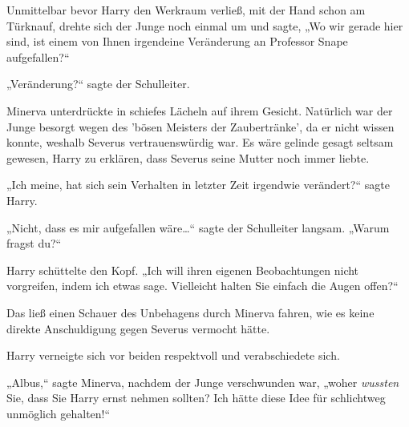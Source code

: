 Unmittelbar bevor Harry den Werkraum verließ, mit der Hand schon am Türknauf, drehte sich der Junge noch einmal um und sagte, „Wo wir gerade hier sind, ist einem von Ihnen irgendeine Veränderung an Professor Snape aufgefallen?“

„Veränderung?“ sagte der Schulleiter.

Minerva unterdrückte in schiefes Lächeln auf ihrem Gesicht. Natürlich war der Junge besorgt wegen des 'bösen Meisters der Zaubertränke', da er nicht wissen konnte, weshalb Severus vertrauenswürdig war. Es wäre gelinde gesagt seltsam gewesen, Harry zu erklären, dass Severus seine Mutter noch immer liebte.

„Ich meine, hat sich sein Verhalten in letzter Zeit irgendwie verändert?“ sagte Harry.

„Nicht, dass es mir aufgefallen wäre…“ sagte der Schulleiter langsam. „Warum fragst du?“

Harry schüttelte den Kopf. „Ich will ihren eigenen Beobachtungen nicht vorgreifen, indem ich etwas sage. Vielleicht halten Sie einfach die Augen offen?“

Das ließ einen Schauer des Unbehagens durch Minerva fahren, wie es keine direkte Anschuldigung gegen Severus vermocht hätte.

Harry verneigte sich vor beiden respektvoll und verabschiedete sich.

\later

„Albus,“ sagte Minerva, nachdem der Junge verschwunden war, „woher \emph{wussten} Sie, dass Sie Harry ernst nehmen sollten? Ich hätte diese Idee für schlichtweg unmöglich gehalten!“

